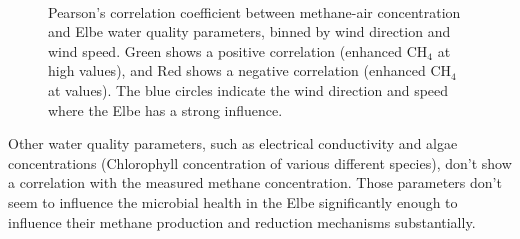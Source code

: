 \begin{figure}[t!]
    \hfill
    \\
    \hfill
    \caption[Correlation between CH$_4$ and Water quality]{Pearson's correlation coefficient between methane-air concentration and Elbe water quality parameters, binned by wind direction and wind speed. Green shows a positive correlation (enhanced CH$_4$ at high values), and Red shows a negative correlation (enhanced CH$_4$ at values). The blue circles indicate the wind direction and speed where the Elbe has a strong influence.}
    \label{CorrelationWaterQuality}
\end{figure}
Other water quality parameters, such as electrical conductivity and algae concentrations (Chlorophyll concentration of various different species), don't show a correlation with the measured methane concentration. Those parameters don't seem to influence the microbial health in the Elbe significantly enough to influence their methane production and reduction mechanisms substantially.


